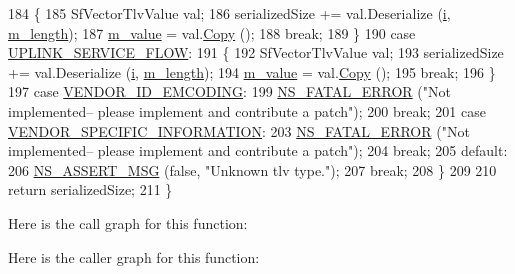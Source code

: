 \begin{DoxyCode}
184       \{
185         SfVectorTlvValue val;
186         serializedSize += val.Deserialize (\hyperlink{bernuolliDistribution_8m_a6f6ccfcf58b31cb6412107d9d5281426}{i}, \hyperlink{classns3_1_1Tlv_a283be5043bd1d6accea0fb54b27824ce}{m\_length});
187         \hyperlink{classns3_1_1Tlv_add00ad86b735ae058202b756bdc1d15c}{m\_value} = val.\hyperlink{classns3_1_1TlvValue_aefbf94f1455b233c9a0d10f39526c5ff}{Copy} ();
188         \textcolor{keywordflow}{break};
189       \}
190     \textcolor{keywordflow}{case} \hyperlink{classns3_1_1Tlv_ab275ea003645d46aada8e2b351de90e3a3b5488fc87cf6e32674c512bbf6bbb84}{UPLINK\_SERVICE\_FLOW}:
191       \{
192         SfVectorTlvValue val;
193         serializedSize += val.Deserialize (\hyperlink{bernuolliDistribution_8m_a6f6ccfcf58b31cb6412107d9d5281426}{i}, \hyperlink{classns3_1_1Tlv_a283be5043bd1d6accea0fb54b27824ce}{m\_length});
194         \hyperlink{classns3_1_1Tlv_add00ad86b735ae058202b756bdc1d15c}{m\_value} = val.\hyperlink{classns3_1_1TlvValue_aefbf94f1455b233c9a0d10f39526c5ff}{Copy} ();
195         \textcolor{keywordflow}{break};
196       \}
197     \textcolor{keywordflow}{case} \hyperlink{classns3_1_1Tlv_ab275ea003645d46aada8e2b351de90e3a480d5439b60bdb46b43b38503a3bafdb}{VENDOR\_ID\_EMCODING}:
199       \hyperlink{group__fatal_ga5131d5e3f75d7d4cbfd706ac456fdc85}{NS\_FATAL\_ERROR} (\textcolor{stringliteral}{"Not implemented-- please implement and contribute a patch"});
200       \textcolor{keywordflow}{break};
201     \textcolor{keywordflow}{case} \hyperlink{classns3_1_1Tlv_ab275ea003645d46aada8e2b351de90e3aa635aca273fbc5a3d4d63d69bd7b665f}{VENDOR\_SPECIFIC\_INFORMATION}:
203       \hyperlink{group__fatal_ga5131d5e3f75d7d4cbfd706ac456fdc85}{NS\_FATAL\_ERROR} (\textcolor{stringliteral}{"Not implemented-- please implement and contribute a patch"});
204       \textcolor{keywordflow}{break};
205     \textcolor{keywordflow}{default}:
206       \hyperlink{assert_8h_aff5ece9066c74e681e74999856f08539}{NS\_ASSERT\_MSG} (\textcolor{keyword}{false}, \textcolor{stringliteral}{"Unknown tlv type."});
207       \textcolor{keywordflow}{break};
208     \}
209 
210   \textcolor{keywordflow}{return} serializedSize;
211 \}
\end{DoxyCode}


Here is the call graph for this function\+:




Here is the caller graph for this function\+:


